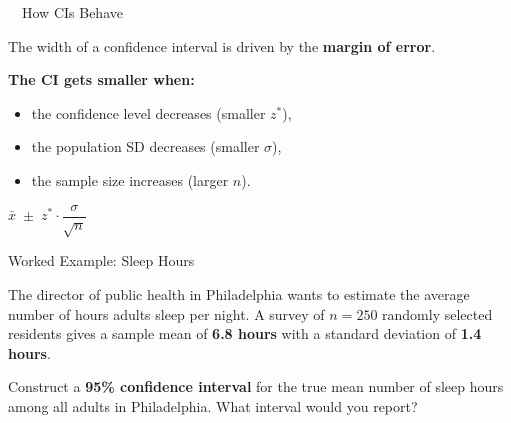 \documentclass[aspectratio=169,11pt]{beamer}
\begin{document}
\begin{frame}{\ \ How CIs Behave}
  \begin{keybox}
    The width of a confidence interval is driven by the \textbf{margin of error}.
  \end{keybox}
  \vspace{0.6em}
  \textbf{\color{qrnavy}The CI gets smaller when:}
  \begin{itemize}
    \item the confidence level decreases (smaller $z^{*}$),
    \item the population SD decreases (smaller $\sigma$),
    \item the sample size increases (larger $n$).
  \end{itemize}
  \vspace{0.5em}
  \begin{center}
    $\bar{x} \;\pm\; z^{*}\cdot\dfrac{\sigma}{\sqrt{n}}$
  \end{center}
\end{frame}

\begin{frame}{Worked Example: Sleep Hours}
  \begin{keybox}[Scenario]
    The director of public health in Philadelphia wants to estimate the average
    number of hours adults sleep per night. A survey of \textbf{$n = 250$}
    randomly selected residents gives a sample mean of \textbf{6.8 hours} with a
    standard deviation of \textbf{1.4 hours}.
  \end{keybox}
  \vspace{0.6em}
  \begin{center}
    Construct a \textbf{95\% confidence interval} for the true mean number of
    sleep hours among all adults in Philadelphia. What interval would you report?
  \end{center}
\end{frame}
\end{document}
